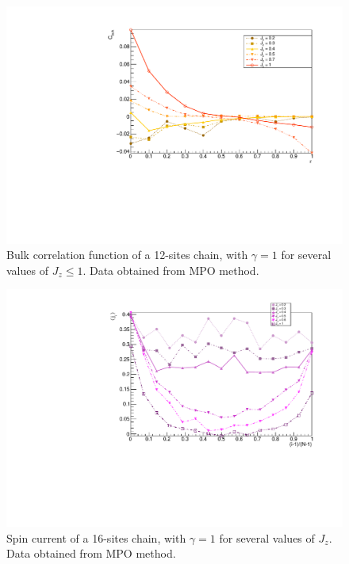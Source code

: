 \begin{figure}[H]
    \centering
    \includegraphics[scale=0.7]{Figures/12sites/12sites_CFBulkVSLowJz.pdf}
    \caption{Bulk correlation function of a 12-sites chain, with $\gamma = 1$ for several values of $J_z \leq 1$. Data obtained from MPO method.}
    \label{fig:12sites_CFBulkVSLowJz}
\end{figure}

\begin{figure}[H]
    \centering
    \includegraphics[scale=0.7]{Figures/16sites/16sites_SpinCurrVaryingJz.pdf}
    \caption{Spin current of a 16-sites chain, with $\gamma = 1$ for several values of $J_z$. Data obtained from MPO method.}
    \label{fig:16sites_SpinCurrVaryingJz}
\end{figure}

